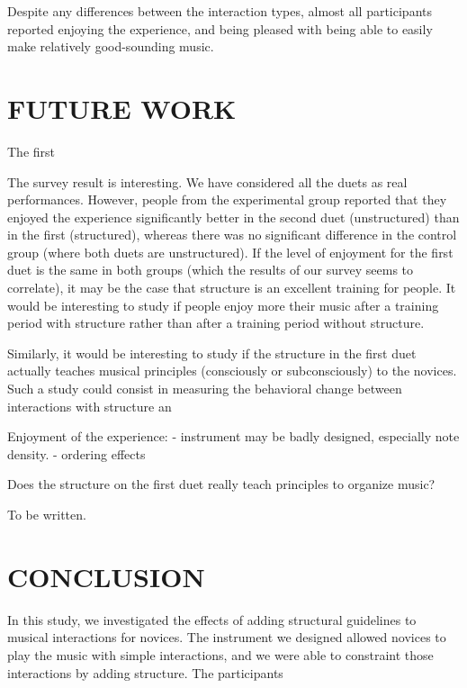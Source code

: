 \documentclass{article}
\begin{document}
Despite any differences between the interaction types, almost all participants reported enjoying the experience, and being pleased with being able to easily make relatively good-sounding music.






\section{FUTURE WORK}

The first 

The survey result is interesting. We have considered all the duets as real performances. However, people from the experimental group reported that they enjoyed the experience significantly better in the second duet (unstructured) than in the first (structured), whereas there was no significant difference in the control group (where both duets are unstructured). If the level of enjoyment for the first duet is the same in both groups (which the results of our survey seems to correlate), it may be the case that structure is an excellent training for people. It would be interesting to study if people enjoy more their music after a training period with structure rather than after a training period without structure.

Similarly, it would be interesting to study if the structure in the first duet actually teaches musical principles (consciously or subconsciously) to the novices. Such a study could consist in measuring the behavioral change between interactions with structure an



Enjoyment of the experience:
- instrument may be badly designed, especially note density.
- ordering effects

Does the structure on the first duet really teach principles to organize music? 

To be written.




\section{CONCLUSION}

In this study, we investigated the effects of adding structural guidelines to musical interactions for novices. The instrument we designed allowed novices to play the music with simple interactions, and we were able to constraint those interactions by adding structure. The participants 
\end{document}
